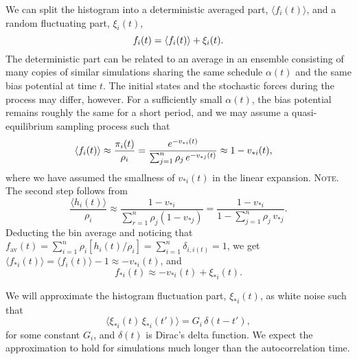 \documentclass[reprint, superscriptaddress, floatfix]{revtex4-1}
\newcommand{\note}[1]{{\color{DarkGreen}\footnotesize \textsc{Note.} #1}}
\newcommand{\bav}[1]{#1_\mathrm{av}}
\begin{document}
We can split the histogram into
a deterministic averaged part, $\langle f_i(t) \rangle$,
and a random fluctuating part, $\xi_i(t)$,
%
\begin{equation}
  f_i(t) =
  \langle f_i(t) \rangle
  +
  \xi_i(t)
  .
  \notag
\end{equation}
%
The deterministic part can be related
to an average in an ensemble consisting of
many copies of similar simulations
sharing the same schedule $\alpha(t)$
and the same bias potential at time $t$.
%
The initial states and the stochastic forces
during the process may differ, however.
%
For a sufficiently small $\alpha(t)$,
the bias potential remains roughly the same for a short period,
and we may assume a quasi-equilibrium sampling process
such that
%
\begin{align}
  \langle f_i(t) \rangle
  &\approx
  \frac{ \pi_i(t) } { \rho_i }
  =
  \frac{                          e^{-v_{*i}(t)} }
       { \sum_{j = 1}^n \rho_j \, e^{-v_{*j}(t)} }
  \approx
  1 - v_{*i}(t)
  ,
  \notag
\end{align}
%
where we have assumed the smallness
of $v_{*i}(t)$ in the linear expansion.
%
\note{
The second step follows from
$$
\frac{ \langle h_i(t) \rangle }
     { \rho_i }
\approx
\frac{                       1 - v_{*i}  }
     { \sum_{ r = 1 }^n \rho_j (1 - v_{*j}) }
=
\frac{                       1 - v_{*i}  }
     { 1 - \sum_{ j = 1 }^n \rho_j \, v_{*j} }
.
$$
}%
%
Deducting the bin average
and noticing that
$\bav{f}(t) = \sum_{i=1}^n \rho_i [h_i(t)/\rho_i] = \sum_{i=1}^n \delta_{i, i(t)} = 1$,
we get
$\langle f_{*i}(t) \rangle = \langle f_i(t) \rangle - 1 \approx - v_{*i}(t)$,
%
%
and
%
\begin{equation}
  f_{*i}(t) \approx - v_{*i}(t) + \xi_{*i}(t)
  .
  \label{eq:sh_ave}
\end{equation}


We will approximate the histogram fluctuation part, $\xi_{*i}(t)$,
as white noise such that
%
\begin{equation}
  \langle \xi_{*i}(t) \, \xi_{*i}(t') \rangle
  = G_i \, \delta(t - t')
  ,
  \label{eq:Gi_def}
\end{equation}
%
for some constant $G_i$,
and $\delta(t)$ is Dirac's delta function.
%
We expect the approximation to hold
for simulations much longer than the autocorrelation time.
\end{document}
